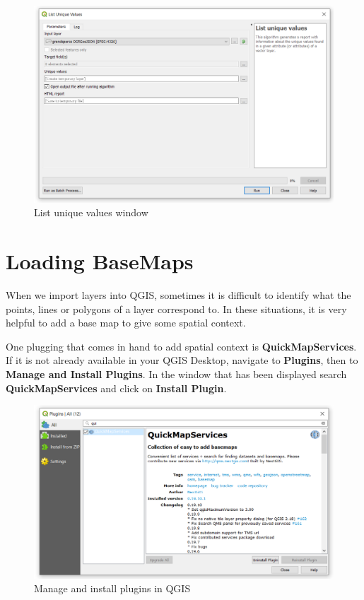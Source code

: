 \documentclass[]{book}
\theoremstyle{definition}
\theoremstyle{definition}
\theoremstyle{definition}
\theoremstyle{remark}
\begin{document}
\begin{figure}

{\centering \includegraphics[width=14.79in]{figures/List_Unique_Values} 

}

\caption{List unique values window}\label{fig:unnamed-chunk-23}
\end{figure}

\section{Loading BaseMaps}\label{basemaps}

When we import layers into QGIS, sometimes it is difficult to identify
what the points, lines or polygons of a layer correspond to. In these
situations, it is very helpful to add a base map to give some spatial
context.

One plugging that comes in hand to add spatial context is
\textbf{QuickMapServices}. If it is not already available in your QGIS
Desktop, navigate to \textbf{Plugins}, then to \textbf{Manage and
Install Plugins}. In the window that has been displayed search
\textbf{QuickMapServices} and click on \textbf{Install Plugin}.

\begin{figure}

{\centering \includegraphics[width=14.35in]{figures/QuickMapServices} 

}

\caption{Manage and install plugins in QGIS}\label{fig:unnamed-chunk-24}
\end{figure}
\end{document}
